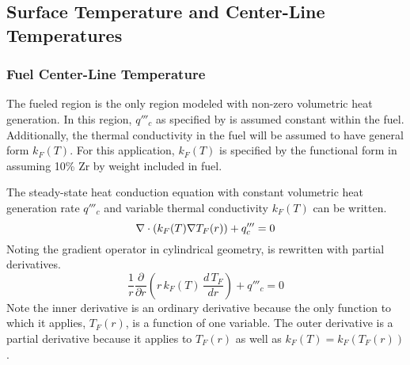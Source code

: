   \subsection{Surface Temperature and Center-Line Temperatures}
    \subsubsection{Fuel Center-Line Temperature}
      The fueled region is the only region modeled with non-zero volumetric heat
      generation. In this region, $q'''_c$ as specified by 
       is assumed constant within the fuel. 
      Additionally, the thermal conductivity in the fuel will be assumed to have
      general form $k_F(T)$. For this application, $k_F(T)$ is specified by the
      functional form in \cite{fuelProp} assuming 10\% Zr by weight included in
      fuel.

      The steady-state heat conduction equation with constant volumetric heat
      generation rate $q'''_c$ and variable thermal conductivity $k_F(T)$ can be
      written.
      \begin{equation}
        \label{eq:conduction_fuel}
        \mathbf{\nabla} \cdot (k_F(T) \mathbf{\nabla} T_F(r)) + q'''_c = 0
      \end{equation}
      Noting the gradient operator in cylindrical geometry,
       is rewritten with partial derivatives.
      \begin{equation}
        \label{eq:conduction_fuel_cylindrical}
        \frac{1}{r} \frac{\partial}{\partial r} \left( r \, k_F(T) \, 
          \frac{d \, T_F}{dr} \right) + q'''_c = 0
      \end{equation}
      Note the inner derivative is an ordinary derivative because the only
      function to which it applies, $T_F(r)$, is a function of one variable. The
      outer derivative is a partial derivative because it applies to $T_F(r)$ as
      well as $k_F(T) = k_F(T_F(r))$.

